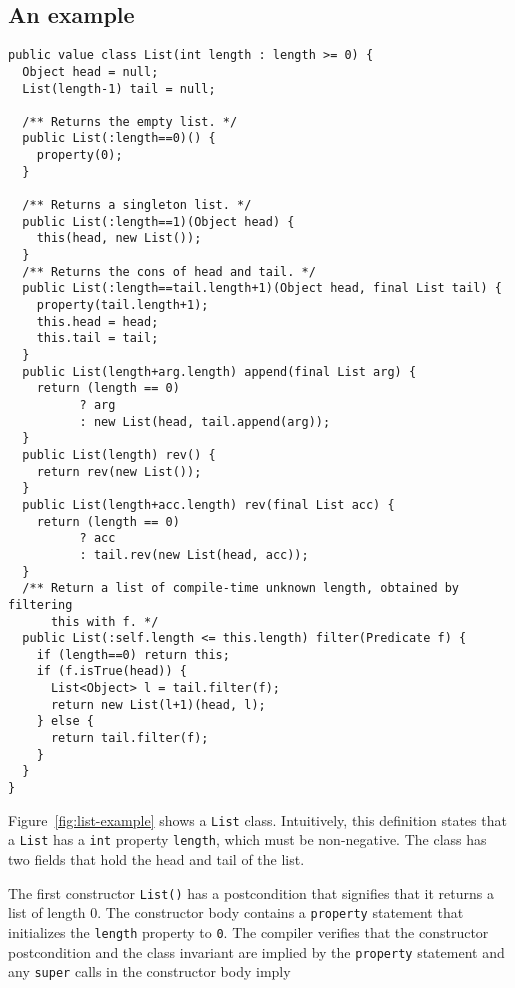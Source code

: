 \subsection{An example}

\begin{figure*}
{\footnotesize
\begin{verbatim}
public value class List(int length : length >= 0) {
  Object head = null;
  List(length-1) tail = null;

  /** Returns the empty list. */
  public List(:length==0)() {
    property(0);
  }

  /** Returns a singleton list. */
  public List(:length==1)(Object head) {
    this(head, new List());
  }
  /** Returns the cons of head and tail. */
  public List(:length==tail.length+1)(Object head, final List tail) {
    property(tail.length+1);
    this.head = head;
    this.tail = tail;
  }
  public List(length+arg.length) append(final List arg) {
    return (length == 0)
          ? arg
          : new List(head, tail.append(arg));
  }
  public List(length) rev() {
    return rev(new List());
  }
  public List(length+acc.length) rev(final List acc) {
    return (length == 0)
          ? acc
          : tail.rev(new List(head, acc));
  }
  /** Return a list of compile-time unknown length, obtained by filtering
      this with f. */
  public List(:self.length <= this.length) filter(Predicate f) {
    if (length==0) return this;
    if (f.isTrue(head)) {
      List<Object> l = tail.filter(f);
      return new List(l+1)(head, l);
    } else {
      return tail.filter(f);
    }
  }
}
\end{verbatim}}
\caption{List example}
\label{fig:list-example}
\end{figure*}

Figure~\ref{fig:list-example} shows a {\tt List} class.
Intuitively, this definition states that a {\tt List} has a {\tt int}
property {\tt length}, which must be non-negative.  The
class has two fields that hold the head and tail of the list.

The first constructor {\tt List()} has a postcondition that
signifies that it returns a list of length 0.
The constructor body contains a {\tt property} statement
that initializes the {\tt length} property to {\tt 0}.
The compiler verifies that
the constructor postcondition and the class invariant
are implied by the {\tt property} statement
and any {\tt super} calls in the constructor body imply

